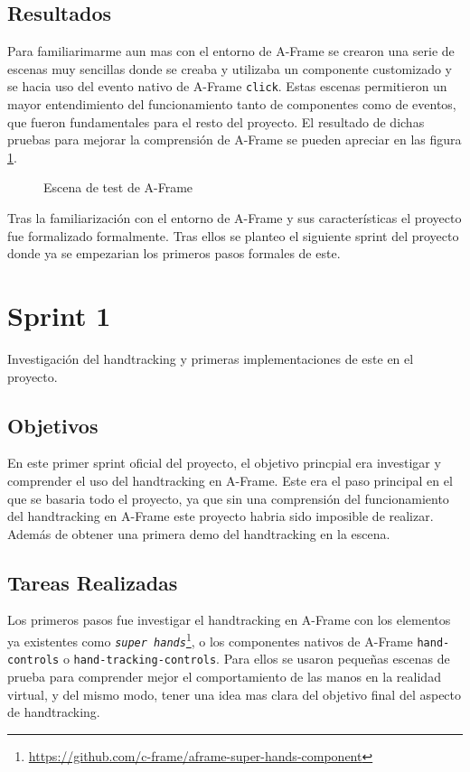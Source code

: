 \documentclass[a4paper, 12pt]{book}
\begin{document}
\subsection{Resultados}
\label{subsec:resultados0}
Para familiarimarme aun mas con el entorno de A-Frame se crearon una serie de escenas muy sencillas donde se creaba y utilizaba un componente customizado y se hacia uso del evento nativo de A-Frame \texttt{click}. Estas escenas permitieron un mayor entendimiento del funcionamiento tanto de componentes como de eventos, que fueron fundamentales para el resto del proyecto.
El resultado de dichas pruebas para mejorar la comprensión de A-Frame se pueden apreciar en las figura \ref{fig:sprint0}.
\begin{figure}[H] 
  \centering
  \fbox{\rule{0pt}{150pt} \rule{0.7\textwidth}{0pt}} 
  \caption{Escena de test de A-Frame}
  \label{fig:sprint0}
\end{figure}

Tras la familiarización con el entorno de A-Frame y sus características el proyecto fue formalizado formalmente. Tras ellos se planteo el siguiente sprint del proyecto donde ya se empezarian los primeros pasos formales de este. 

\section{Sprint 1}
\label{sec:sprint1}
Investigación del handtracking y primeras implementaciones de este en el proyecto.

\subsection{Objetivos}
\label{subsec:objetivo-principal1}
En este primer sprint oficial del proyecto, el objetivo princpial era investigar y comprender el uso del handtracking en A-Frame. 
Este era el paso principal en el que se basaria todo el proyecto, ya que sin una comprensión del funcionamiento del handtracking en A-Frame este proyecto habria sido imposible de realizar.
Además de obtener una primera demo del handtracking en la escena.
\subsection{Tareas Realizadas}
\label{subsec:implementacion1}
Los primeros pasos fue investigar el handtracking en A-Frame con los elementos ya existentes como \textit{\texttt{super hands}}\footnote{\url{https://github.com/c-frame/aframe-super-hands-component}}, o los componentes nativos de A-Frame \texttt{hand-controls} o \texttt{hand-tracking-controls}.
Para ellos se usaron pequeñas escenas de prueba para comprender mejor el comportamiento de las manos en la realidad virtual, y del mismo modo, tener una idea mas clara del objetivo final del aspecto de handtracking. 
\end{document}
